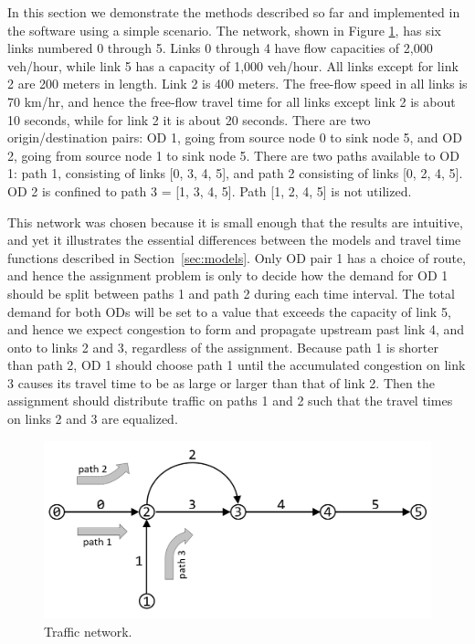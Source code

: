 In this section we demonstrate the methods described so far and implemented in the software using a simple scenario. The network, shown in Figure \ref{fig:config}, has six links numbered 0 through 5. Links 0 through 4 have flow capacities of 2,000 veh/hour, while link 5 has a capacity of 1,000 veh/hour. All links except for link 2 are 200 meters in length. Link 2 is 400 meters. The free-flow speed in all links is 70 km/hr, and hence the free-flow travel time for all links except link 2 is about 10 seconds, while for link 2 it is about 20 seconds. There are two origin/destination pairs: OD 1, going from source node 0 to sink node 5, and OD 2, going from source node 1 to sink node 5. There are two paths available to OD 1: path 1, consisting of links [0, 3, 4, 5], and path 2 consisting of links [0, 2, 4, 5]. OD 2 is confined to path 3 = [1, 3, 4, 5]. Path [1, 2, 4, 5] is not utilized.

This network was chosen because it is small enough that the results are intuitive, and yet it illustrates the essential differences between the models and travel time functions described in Section~\ref{sec:models}. Only OD pair 1 has a choice of route, and hence the assignment problem is only to decide how the demand for OD 1 should be split between paths 1 and path 2 during each time interval. The total demand for both ODs will be set to a value that exceeds the capacity of link 5, and hence we expect congestion to form and propagate upstream past link 4, and onto to links 2 and 3, regardless of the assignment. Because path 1 is shorter than path 2, OD 1 should choose path 1 until the accumulated congestion on link 3 causes its travel time to be as large or larger than that of link 2. Then the assignment should distribute traffic on paths 1 and 2 such that the travel times on links 2 and 3 are equalized. 

\begin{figure}[h]
    \centering
    \includegraphics[width=\linewidth]{figs/config.png}
    \caption{Traffic network.}
    \label{fig:config}
\end{figure}


